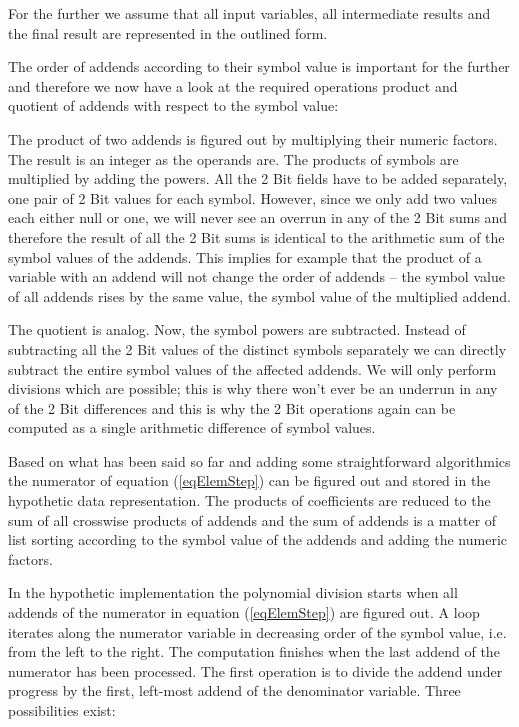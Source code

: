 For the further we assume that all input variables, all intermediate
results and the final result are represented in the outlined form.

The order of addends according to their symbol value is important for the
further and therefore we now have a look at the required operations product
and quotient of addends with respect to the symbol value:

The product of two addends is figured out by multiplying their numeric
factors. The result is an integer as the operands are. The products of
symbols are multiplied by adding the powers. All the 2 Bit fields have to
be added separately, one pair of 2 Bit values for each symbol. However,
since we only add two values each either null or one, we will never see an
overrun in any of the 2 Bit sums and therefore the result of all the 2 Bit
sums is identical to the arithmetic sum of the symbol values of the
addends. This implies for example that the product of a variable with an
addend will not change the order of addends -- the symbol value of all
addends rises by the same value, the symbol value of the multiplied
addend.

The quotient is analog. Now, the symbol powers are subtracted. Instead of
subtracting all the 2 Bit values of the distinct symbols separately we can
directly subtract the entire symbol values of the affected addends. We
will only perform divisions which are possible; this is why there won't
ever be an underrun in any of the 2 Bit differences and this is why the 2
Bit operations again can be computed as a single arithmetic difference of
symbol values.

Based on what has been said so far and adding some straightforward
algorithmics the numerator of equation (\ref{eqElemStep}) can be figured
out and stored in the hypothetic data representation. The products of
coefficients are reduced to the sum of all crosswise products of addends
and the sum of addends is a matter of list sorting according to the symbol
value of the addends and adding the numeric factors.

In the hypothetic implementation the polynomial division starts when all
addends of the numerator in equation (\ref{eqElemStep}) are figured out. A
loop iterates along the numerator variable in decreasing order of the
symbol value, i.e. from the left to the right. The computation finishes
when the last addend of the numerator has been processed. The first
operation is to divide the addend under progress by the first, left-most
addend of the denominator variable. Three possibilities exist:

